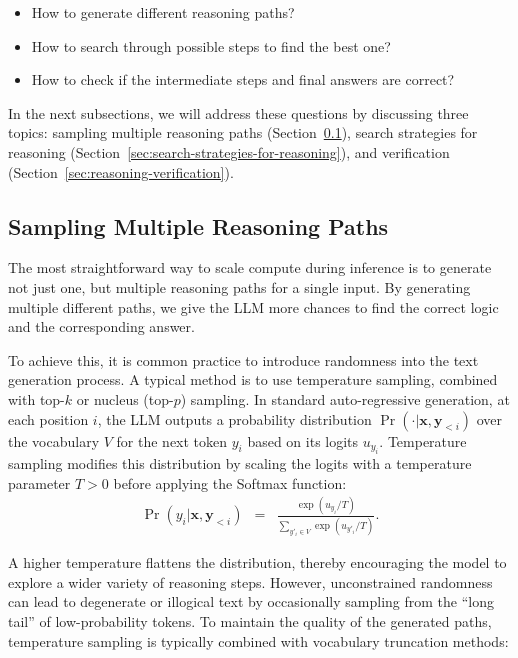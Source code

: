 \begin{itemize}
\item \vspace{0.5em} How to generate different reasoning paths?
\item \vspace{0.3em} How to search through possible steps to find the best one?
\item \vspace{0.3em} How to check if the intermediate steps and final answers are correct?
\end{itemize}
\vspace{0.5em}

In the next subsections, we will address these questions by discussing three topics: sampling multiple reasoning paths (Section~\ref{sec:sampling-reasoning-paths}), search strategies for reasoning (Section~\ref{sec:search-strategies-for-reasoning}), and verification (Section~\ref{sec:reasoning-verification}).

\subsection{Sampling Multiple Reasoning Paths}
\label{sec:sampling-reasoning-paths}

The most straightforward way to scale compute during inference is to generate not just one, but multiple reasoning paths for a single input. By generating multiple different paths, we give the LLM more chances to find the correct logic and the corresponding answer.

To achieve this, it is common practice to introduce randomness into the text generation process. A typical method is to use temperature sampling, combined with top-$k$ or nucleus (top-$p$) sampling. In standard auto-regressive generation, at each position $i$, the LLM outputs a probability distribution $\Pr(\cdot | \mathbf{x}, \mathbf{y}_{< i})$ over the vocabulary $V$ for the next token $y_i$ based on its logits $u_{y_i}$. Temperature sampling modifies this distribution by scaling the logits with a temperature parameter $T > 0$ before applying the Softmax function:
\begin{eqnarray}
\Pr(y_i | \mathbf{x}, \mathbf{y}_{< i}) & = & \frac{\exp(u_{y_i} / T)}{\sum_{y'_i \in V} \exp(u_{y'_i} / T)}.
\end{eqnarray}

\noindent A higher temperature flattens the distribution, thereby encouraging the model to explore a wider variety of reasoning steps. However, unconstrained randomness can lead to degenerate or illogical text by occasionally sampling from the ``long tail'' of low-probability tokens. To maintain the quality of the generated paths, temperature sampling is typically combined with vocabulary truncation methods:

